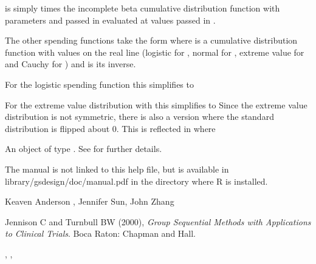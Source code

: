 \begin{Details}\relax
{} is simply  times the incomplete beta cumulative distribution 
function with parameters
 and  passed in  evaluated at values passed in . 

The other spending functions take the form
where  is a cumulative distribution function with values  on the real line (logistic for , 
normal for , extreme value for  and Cauchy for ) and
 is its inverse.

For the logistic spending function this simplifies to

For the extreme value distribution with  this simplifies to 
 Since the extreme value distribution is not symmetric, there is also a version
where the standard distribution is flipped about 0. This is reflected in  where
\end{Details}
\begin{Value}
An object of type . See  for further details.
\end{Value}
\begin{Note}\relax
The manual is not linked to this help file, but is available in library/gsdesign/doc/manual.pdf
in the directory where R is installed.
\end{Note}
\begin{Author}\relax
Keaven Anderson , Jennifer Sun, John Zhang
\end{Author}
\begin{References}\relax
Jennison C and Turnbull BW (2000), \emph{Group Sequential Methods with Applications to Clinical Trials}.
Boca Raton: Chapman and Hall.
\end{References}
\begin{SeeAlso}\relax
{}, , 
\end{SeeAlso}
